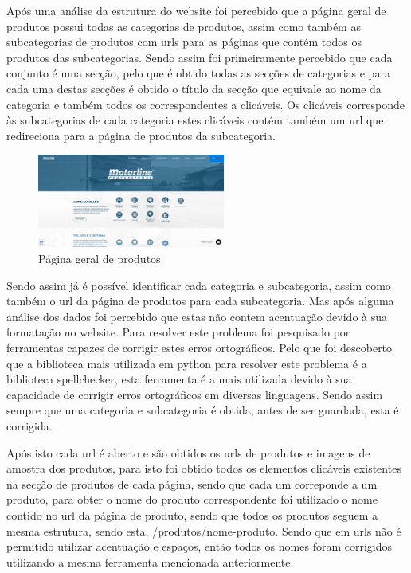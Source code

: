 \newpage

Após uma análise da estrutura do website foi percebido que a página geral de produtos possui todas as categorias
de produtos, assim como também as subcategorias de produtos com urls para as páginas que contém todos os produtos
das subcategorias. Sendo assim foi primeiramente percebido que cada conjunto é uma secção, pelo que é obtido
todas as secções de categorias e para cada uma destas secções é obtido o título da secção que equivale ao nome da
categoria e também todos os correspondentes a clicáveis. Os clicáveis corresponde às subcategorias de cada categoria
estes clicáveis contém também um url que redireciona para a página de produtos da subcategoria.

\begin{figure}[htb]
    \centering
    
    \includegraphics[width=0.55\textwidth]{images/implementacao/scraper/pagina_geral_produtos.png}
    \caption{Página geral de produtos}
    \label{fig:50}
\end{figure}

Sendo assim já é possível identificar cada categoria e subcategoria, assim como também o url da página de produtos
para cada subcategoria. Mas após alguma análise dos dados foi percebido que estas não contem acentuação devido à 
sua formatação no website. Para resolver este problema foi pesquisado por ferramentas capazes de corrigir estes
erros ortográficos. Pelo que foi descoberto que a biblioteca mais utilizada em python para resolver este problema 
é a biblioteca spellchecker, esta ferramenta é a mais utilizada devido à sua capacidade de corrigir erros ortográficos
em diversas linguagens. Sendo assim sempre que uma categoria e subcategoria é obtida, antes de ser guardada, esta é corrigida.

Após isto cada url é aberto e são obtidos os urls de produtos e imagens de amostra dos produtos, para isto foi obtido todos os
elementos clicáveis existentes na secção de produtos de cada página, sendo que cada um correponde a um produto, para obter o nome
do produto correspondente foi utilizado o nome contido no url da página de produto, sendo que todos os produtos seguem a mesma 
estrutura, sendo esta, /produtos/nome-produto. Sendo que em urls não é permitido utilizar acentuação e espaços, então todos os 
nomes foram corrigidos utilizando a mesma ferramenta mencionada anteriormente.

